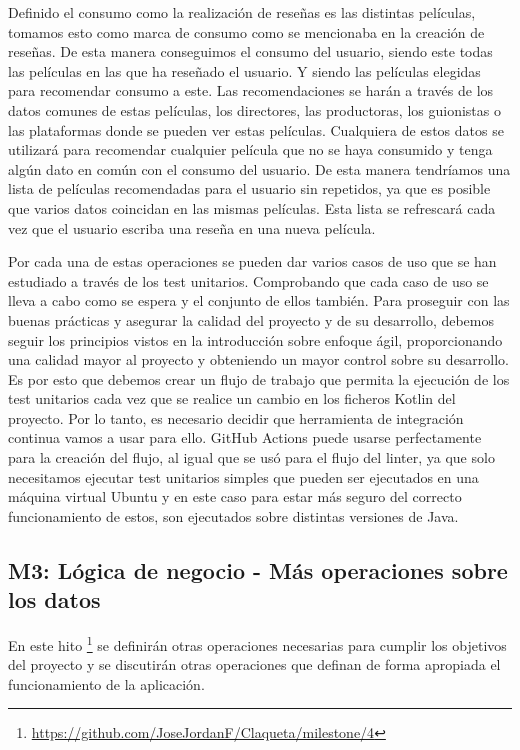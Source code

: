 Definido el consumo como la realización de reseñas es las distintas películas, tomamos esto como marca 
de consumo como se mencionaba en la creación de reseñas. De esta manera conseguimos el consumo del 
usuario, siendo este todas las películas en las que ha reseñado el usuario. Y siendo las películas 
elegidas para recomendar consumo a este. Las recomendaciones se harán a través de los datos comunes de 
estas películas, los directores, las productoras, los guionistas o las plataformas donde se pueden ver 
estas películas. Cualquiera de estos datos se utilizará para recomendar cualquier película que no se 
haya consumido y tenga algún dato en común con el consumo del usuario. De esta manera tendríamos una 
lista de películas recomendadas para el usuario sin repetidos, ya que es posible que varios datos 
coincidan en las mismas películas. Esta lista se refrescará cada vez que el usuario escriba una reseña 
en una nueva película.

Por cada una de estas operaciones se pueden dar varios casos de uso que se han estudiado a través de 
los test unitarios. Comprobando que cada caso de uso se lleva a cabo como se espera y el conjunto de 
ellos también. Para proseguir con las buenas prácticas y asegurar la calidad del proyecto y de su desarrollo, 
debemos seguir los principios vistos en la introducción sobre enfoque ágil, proporcionando una calidad mayor al 
proyecto y obteniendo un mayor control sobre su desarrollo. Es por esto que debemos crear un flujo de trabajo 
que permita la ejecución de los test unitarios cada vez que se realice un cambio en los ficheros Kotlin del 
proyecto. Por lo tanto, es necesario decidir que herramienta de integración continua vamos a usar para ello. 
GitHub Actions puede usarse perfectamente para la creación del flujo, al igual que se usó para el flujo del 
linter, ya que solo necesitamos ejecutar test unitarios simples que pueden ser ejecutados en una máquina virtual 
Ubuntu y en este caso para estar más seguro del correcto funcionamiento de estos, son ejecutados sobre distintas 
versiones de Java.

\subsection{M3: Lógica de negocio - Más operaciones sobre los datos}

En este hito \footnote{\url{https://github.com/JoseJordanF/Claqueta/milestone/4}} se definirán otras operaciones 
necesarias para cumplir los objetivos del proyecto y se discutirán otras operaciones que definan de forma apropiada
el funcionamiento de la aplicación. 

